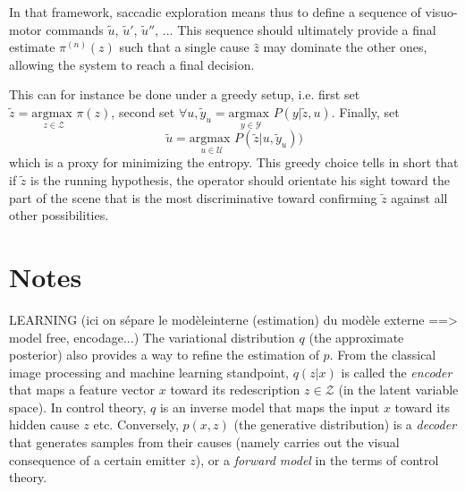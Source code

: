 \documentclass[12pt,twoside,openright]{article}
\begin{document}
	 
	 In that framework, saccadic exploration means thus to define a sequence of visuo-motor commands $\tilde{u}$, $\tilde{u}'$, $\tilde{u}''$, ... This sequence should ultimately provide a final estimate $\pi^{(n)}(z)$ such that a single cause $\hat{z}$ may dominate the other ones, allowing the system to reach a final decision.  
	 
	 {\color{blue}
	 	This can for instance be done under a greedy setup, i.e. first set $\tilde{z} = \underset{z \in \mathcal{Z}}{\text{argmax }} \pi(z)$, second set $\forall u, \tilde{y}_u = \underset{y \in \mathcal{Y}}{\text{argmax }} P(y|\tilde{z},u)$.
	 	Finally, set 
	 	\begin{equation}
	 	\tilde{u} = \underset{u \in \mathcal{U}}{\text{argmax }}  P(\tilde{z}|u,\tilde{y}_u))
	 	\end{equation} which is a proxy for minimizing the entropy. This greedy choice tells in short that if $\tilde{z}$ is the running hypothesis, the operator should orientate his sight toward 
	 	the part of the scene that is the most discriminative toward confirming $\tilde{z}$ against all other possibilities. }
	 
	 \section*{Notes}
	
	
	{\color{blue}
	LEARNING (ici on sépare le modèleinterne (estimation) du modèle externe ==> model free, encodage...) The variational distribution $q$ (the approximate posterior) also provides a way to refine the estimation of $p$. From the classical image processing and machine learning standpoint, $q(z|x)$ is called the \emph{encoder} that maps a feature vector $x$ toward its redescription $z \in \mathcal{Z}$ (in the latent variable space). In control theory, $q$ is an inverse model that maps the input $x$ toward its hidden cause $z$ etc. Conversely, $p(x,z)$ (the generative distribution) is a \emph{decoder} that generates samples from their causes (namely carries out the visual consequence of a certain emitter $z$), or a \emph{forward model} in the terms of control theory.}
	
\end{document}
